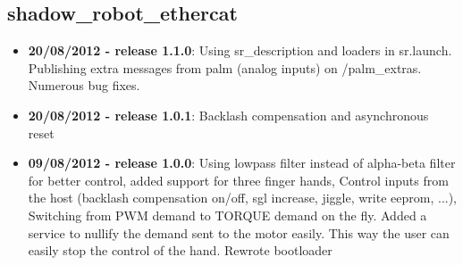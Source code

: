 
\subsection{shadow\_robot\_ethercat}
\label{sec:shadow-robot-ethercat-changelog}

\begin{itemize}
\item \textbf{20/08/2012 - release 1.1.0}: Using sr\_description and loaders in sr\edc.launch. Publishing extra messages from palm (analog inputs) on /palm\_extras. Numerous bug fixes.
\item \textbf{20/08/2012 - release 1.0.1}: Backlash compensation and asynchronous reset
\item \textbf{09/08/2012 - release 1.0.0}: Using lowpass filter instead of alpha-beta filter for better control, added support for three finger hands, Control inputs from the host (backlash compensation on/off, sgl increase, jiggle, write eeprom, ...), Switching from PWM demand to TORQUE demand on the fly. Added a service to nullify the demand sent to the motor easily. This way the user can easily stop the control of the hand. Rewrote bootloader
\end{itemize}